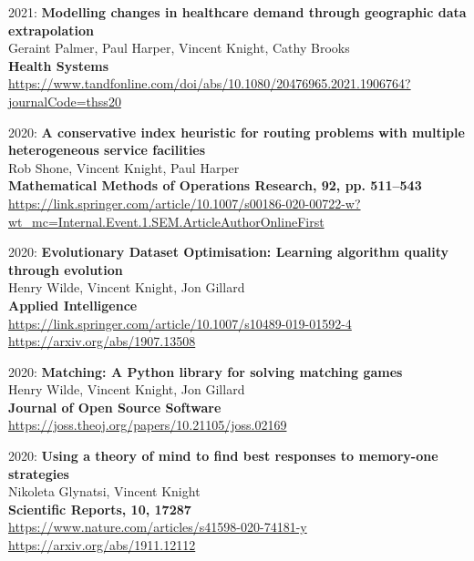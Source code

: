 \documentclass[10pt]{article}
\begin{document}
\begin{etaremune}
\item
  2021: \textbf{Modelling changes in healthcare demand through geographic data extrapolation}\\
  Geraint Palmer, Paul Harper, Vincent Knight, Cathy Brooks\\
  \textbf{Health Systems}\\
  \url{https://www.tandfonline.com/doi/abs/10.1080/20476965.2021.1906764?journalCode=thss20}\\
  

\item
  2020: \textbf{A conservative index heuristic for routing problems with multiple heterogeneous service facilities}\\
  Rob Shone, Vincent Knight, Paul Harper\\
  \textbf{Mathematical Methods of Operations Research, 92, pp. 511--543}\\
  \url{https://link.springer.com/article/10.1007/s00186-020-00722-w?wt_mc=Internal.Event.1.SEM.ArticleAuthorOnlineFirst}\\
  

\item
  2020: \textbf{Evolutionary Dataset Optimisation: Learning algorithm quality through evolution}\\
  Henry Wilde, Vincent Knight, Jon Gillard\\
  \textbf{Applied Intelligence}\\
  \url{https://link.springer.com/article/10.1007/s10489-019-01592-4}\\
  \url{https://arxiv.org/abs/1907.13508}\\

\item
  2020: \textbf{Matching: A Python library for solving matching games}\\
  Henry Wilde, Vincent Knight, Jon Gillard\\
  \textbf{Journal of Open Source Software}\\
  \url{https://joss.theoj.org/papers/10.21105/joss.02169}\\
  

\item
  2020: \textbf{Using a theory of mind to find best responses to memory-one strategies}\\
  Nikoleta Glynatsi, Vincent Knight\\
  \textbf{Scientific Reports, 10, 17287}\\
  \url{https://www.nature.com/articles/s41598-020-74181-y}\\
  \url{https://arxiv.org/abs/1911.12112}\\


\end{etaremune}
\end{document}
